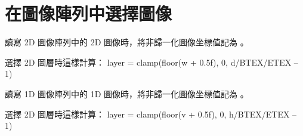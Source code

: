 \section{在圖像陣列中選擇圖像}

讀寫 2D 圖像陣列中的 2D 圖像時，將非歸一化圖像坐標值記為 。

選擇 2D 圖層時這樣計算：
\startclc
layer = clamp(floor(w + 0.5f), 0, d/BTEX/ETEX – 1)
\stopclc

讀寫 1D 圖像陣列中的 1D 圖像時，將非歸一化圖像坐標值記為 。

選擇 2D 圖層時這樣計算：
\startclc
layer = clamp(floor(v + 0.5f), 0, h/BTEX/ETEX – 1)
\stopclc

